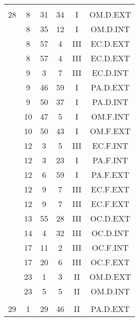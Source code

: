 \documentclass[12pt, a4paper]{article}
\begin{document}
\begin{multicols}{3}
{\begin{tabular}{c c c c c c}
	 	 	 	 & & & & & \\%
	 	 	 	28 & 8 & 31 & 34 & I & OM.D.EXT\\%
	 	 	 	 & 8 & 35 & 12 & I & OM.D.INT\\%
	 	 	 	 & 8 & 57 & 4 & III & EC.D.EXT\\%
	 	 	 	 & 8 & 57 & 4 & III & EC.D.EXT\\%
	 	 	 	 & 9 & 3 & 7 & III & EC.D.INT\\%
	 	 	 	 & 9 & 46 & 59 & I & PA.D.EXT\\%
	 	 	 	 & 9 & 50 & 37 & I & PA.D.INT\\%
	 	 	 	 & 10 & 47 & 5 & I & OM.F.INT\\%
	 	 	 	 & 10 & 50 & 43 & I & OM.F.EXT\\%
	 	 	 	 & 12 & 3 & 5 & III & EC.F.INT\\%
	 	 	 	 & 12 & 3 & 23 & I & PA.F.INT\\%
	 	 	 	 & 12 & 6 & 59 & I & PA.F.EXT\\%
	 	 	 	 & 12 & 9 & 7 & III & EC.F.EXT\\%
	 	 	 	 & 12 & 9 & 7 & III & EC.F.EXT\\%
	 	 	 	 & 13 & 55 & 28 & III & OC.D.EXT\\%
	 	 	 	 & 14 & 4 & 32 & III & OC.D.INT\\%
	 	 	 	 & 17 & 11 & 2 & III & OC.F.INT\\%
	 	 	 	 & 17 & 20 & 6 & III & OC.F.EXT\\%
	 	 	 	 & 23 & 1 & 3 & II & OM.D.EXT\\%
	 	 	 	 & 23 & 5 & 5 & II & OM.D.INT\\%
	 	 	 	 & & & & & \\%
	 	 	 	29 & 1 & 29 & 46 & II & PA.D.EXT\\%

\end{tabular}}
\end{multicols}
\end{document}

